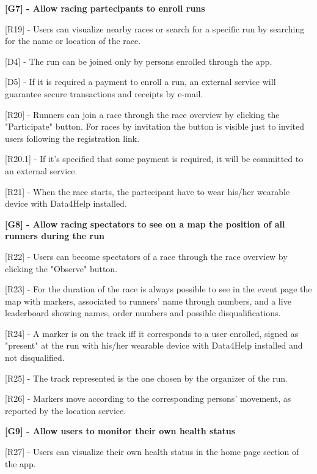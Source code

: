 \hspace{-\parindent}\textbf{[G7] - Allow racing partecipants to enroll runs} \newline

[R19] - Users can visualize nearby races or search for a specific run by searching for the name or location of the race. \newline

[D4] - The run can be joined only by persons enrolled through the app. \newline

[D5] - If it is required a payment to enroll a run, an external service will guarantee secure transactions and receipts by e-mail. \newline

[R20] - Runners can join a race through the race overview by clicking the "Participate" button. For races by invitation the button is visible just to invited users following the registration link. \newline

\hspace{\parindent}[R20.1] - If it's specified that some payment is required, it will be committed to an external service. \newline

[R21] - When the race starts, the partecipant have to wear his/her wearable device with Data4Help installed. \newline

\hspace{-\parindent}\textbf{[G8] - Allow racing spectators to see on a map the position of all runners during the run} \newline

[R22] - Users can become spectators of a race through the race overview by clicking the "Observe" button. \newline

[R23] - For the duration of the race is always possible to see in the event page the map with markers, associated to runners' name through numbers, and a live leaderboard showing names, order numbers and possible disqualifications. \newline

[R24] - A marker is on the track iff it corresponds to a user enrolled, signed as "present" at the run with his/her wearable device with Data4Help installed and not disqualified. \newline

[R25] - The track represented is the one chosen by the organizer of the run. \newline

[R26] - Markers move according to the corresponding persons' movement, as reported by the location service. \newline

\hspace{-\parindent}\textbf{[G9] - Allow users to monitor their own health status} \newline

[R27] - Users can visualize their own health status in the home page section of the app. \newline

%